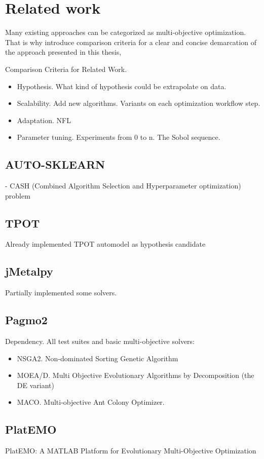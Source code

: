 \chapter{Related work}
    Many existing approaches can be categorized as multi-objective optimization. That is why
    introduce comparison criteria for a clear and concise demarcation of the approach presented in this thesis, 

    Comparison Criteria for Related Work. 
    \begin{itemize}
        \item Hypothesis. What kind of hypothesis could be extrapolate on data.
        \item Scalability. Add new algorithms. Variants on each optimization workflow step.
        \item Adaptation. NFL
        \item Parameter tuning. Experiments from 0 to n. The Sobol sequence.                
    \end{itemize}

    \section{AUTO-SKLEARN} \cite{autosklearn:feurer2015efficient}
    - CASH (Combined Algorithm Selection and Hyperparameter optimization) problem

    \section{TPOT} \cite{OlsonGECCO2016}
    Already implemented TPOT automodel as hypothesis candidate

    \section{jMetalpy} \cite{benitezhidalgo2019jmetalpy}
    Partially implemented some solvers.

    \section{Pagmo2} \cite{francesco_biscani_2019_3582877}
    Dependency.
    All test suites and basic multi-objective solvers:
    \begin{itemize}
        \item NSGA2. Non-dominated Sorting Genetic Algorithm
        \item MOEA/D. Multi Objective Evolutionary Algorithms by Decomposition (the DE variant)
        \item MACO. Multi-objective Ant Colony Optimizer.
    \end{itemize}

    \section{PlatEMO} \cite{PlatEMO}
    PlatEMO: A MATLAB Platform for Evolutionary Multi-Objective Optimization